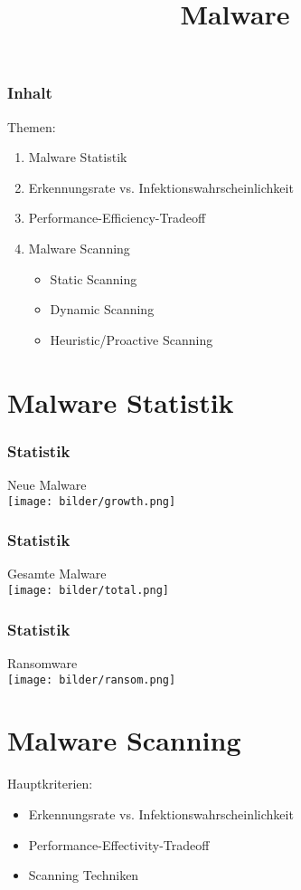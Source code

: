 \documentclass{beamer}
\title[Session Talk]{Malware}
\author{}
\date{}
\begin{document}
\maketitle


\begin{frame}
\frametitle{Inhalt}

\begin{block}{Themen:}
\begin{enumerate}
\item Malware Statistik
\item Erkennungsrate vs. Infektionswahrscheinlichkeit
\item Performance-Efficiency-Tradeoff
\item Malware Scanning
\begin{itemize}
\item Static Scanning
\item Dynamic Scanning
\item Heuristic/Proactive Scanning
\end{itemize}
\end{enumerate}
\end{block}
\end{frame}

\section{Malware Statistik}
\begin{frame}
\frametitle{Statistik}

Neue Malware \\
\texttt{[image: bilder/growth.png]}
\end{frame}

\begin{frame}
\frametitle{Statistik}
Gesamte Malware \\
\texttt{[image: bilder/total.png]}

\end{frame}

\begin{frame}
\frametitle{Statistik}
Ransomware \\
\texttt{[image: bilder/ransom.png]}

\end{frame}



\section{Malware Scanning}
\begin{frame}
Hauptkriterien:
\begin{itemize}
	\item Erkennungsrate vs. Infektionswahrscheinlichkeit
	\item Performance-Effectivity-Tradeoff
	\item Scanning Techniken
\end{itemize}
\end{frame}
\end{document}
